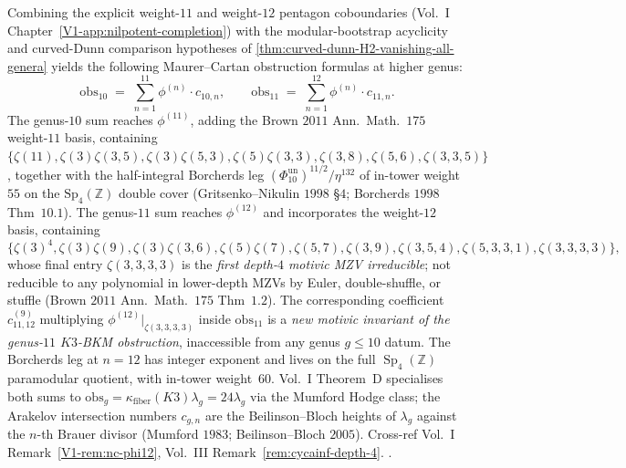 \begin{remark}
\label{rem:cdhg-obs-10-11}
Combining the explicit weight-$11$ and weight-$12$ pentagon coboundaries
(Vol.~I Chapter~\ref{V1-app:nilpotent-completion}) with the
modular-bootstrap acyclicity and curved-Dunn comparison hypotheses of
\autoref{thm:curved-dunn-H2-vanishing-all-genera} yields the following
Maurer--Cartan obstruction formulas at higher genus:
\[
\mathrm{obs}_{10} \;=\; \sum_{n = 1}^{11}\phi^{(n)}\cdot c_{10, n},
\qquad
\mathrm{obs}_{11} \;=\; \sum_{n = 1}^{12}\phi^{(n)}\cdot c_{11, n}.
\]
The genus-$10$ sum reaches $\phi^{(11)}$, adding the
Brown $2011$ Ann.~Math.~$175$ weight-$11$ basis, containing
$\{\zeta(11),\zeta(3)\zeta(3,5),\zeta(3)\zeta(5,3),\zeta(5)\zeta(3,3),
\zeta(3,8),\zeta(5,6),\zeta(3,3,5)\}$, together with the half-integral
Borcherds leg
$(\Phi_{10}^{\mathrm{un}})^{11/2}/\eta^{132}$ of in-tower weight~$55$ on
the $\mathrm{Sp}_4(\mathbb{Z})$ double cover
(Gritsenko--Nikulin $1998$ \S$4$; Borcherds $1998$ Thm~$10.1$). The
genus-$11$ sum reaches $\phi^{(12)}$ and incorporates the
weight-$12$ basis, containing
\[
\bigl\{\zeta(3)^4,\zeta(3)\zeta(9),\zeta(3)\zeta(3,6),\zeta(5)\zeta(7),
\zeta(5,7),\zeta(3,9),\zeta(3,5,4),\zeta(5,3,3,1),\zeta(3,3,3,3)\bigr\},
\]
whose final entry $\zeta(3,3,3,3)$ is the \emph{first depth-$4$
motivic MZV irreducible}; not reducible to any polynomial in
lower-depth MZVs by Euler, double-shuffle, or stuffle
(Brown $2011$ Ann.~Math.~$175$ Thm~$1.2$). The corresponding
coefficient $c_{11, 12}^{(9)}$ multiplying $\phi^{(12)}|_{\zeta(3,3,3,3)}$
inside $\mathrm{obs}_{11}$ is a \emph{new motivic invariant of the
genus-$11$ $K3$-BKM obstruction}, inaccessible from any genus
$g\le 10$ datum. The Borcherds leg at $n = 12$ has integer exponent
and lives on the full $\operatorname{Sp}_4(\mathbb{Z})$ paramodular quotient, with
in-tower weight~$60$. Vol.~I Theorem~D specialises both sums to
$\mathrm{obs}_g = \kappa_{\mathrm{fiber}}(K3)\lambda_g = 24\lambda_g$
via the Mumford Hodge class; the Arakelov intersection numbers
$c_{g, n}$ are the Beilinson--Bloch heights of $\lambda_g$ against
the $n$-th Brauer divisor (Mumford $1983$; Beilinson--Bloch $2005$).
Cross-ref Vol.~I
Remark~\ref{V1-rem:nc-phi12},
Vol.~III Remark~\ref{rem:cycainf-depth-4}.
\cite{Brown2011,Brown2012,Deligne2013,GritsenkoNikulin1998,
 Borcherds1998,Mumford1983,BeilinsonBloch2005}.
\end{remark}

